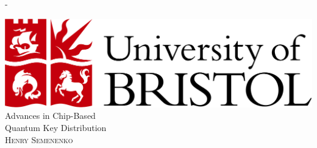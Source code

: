 %
%
% 
%
%
\begin{titlingpage}
\begin{SingleSpace}
\calccentering{\unitlength} 
\begin{adjustwidth*}{\unitlength}{-\unitlength}
\vspace*{0mm}
\begin{center}
\includegraphics[scale=0.25]{logos/bristollogo_colour}\\
\vspace{25mm}
{\HUGE Advances in Chip-Based\\Quantum Key Distribution }\\[4mm]
\vspace{30mm}
{\Large\textsc{Henry Semenenko}}\\

\end{center}
\end{adjustwidth*}
\end{SingleSpace}
\end{titlingpage}
